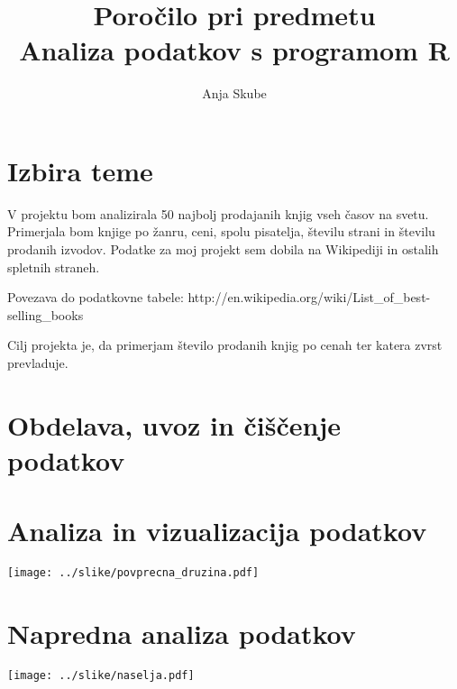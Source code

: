 \documentclass[11pt,a4paper]{article}
\begin{document}
\title{Poročilo pri predmetu \\
Analiza podatkov s programom R}
\author{Anja Skube}
\maketitle

\section{Izbira teme}
V projektu bom analizirala 50 najbolj prodajanih knjig vseh časov na svetu. Primerjala bom knjige po žanru, ceni, spolu pisatelja, številu strani in številu prodanih izvodov.  
Podatke za moj projekt sem dobila na Wikipediji in ostalih spletnih straneh.

Povezava do podatkovne tabele:
http://en.wikipedia.org/wiki/List_of_best-selling_books

Cilj projekta je, da primerjam število prodanih knjig po cenah ter katera zvrst prevladuje. 

\section{Obdelava, uvoz in čiščenje podatkov}

\section{Analiza in vizualizacija podatkov}

\texttt{[image: ../slike/povprecna\_druzina.pdf]}

\section{Napredna analiza podatkov}

\texttt{[image: ../slike/naselja.pdf]}
\end{document}
